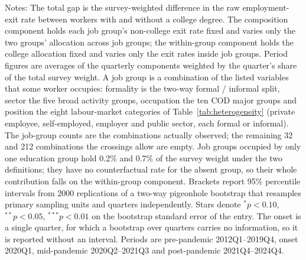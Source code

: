 \begin{table}[H]
\begin{threeparttable}
\begin{tablenotes}[flushleft]
\item Notes: The total gap is the survey-weighted difference in the raw employment-exit rate between workers with and without a college degree. The composition component holds each job group's non-college exit rate fixed and varies only the two groups' allocation across job groups; the within-group component holds the college allocation fixed and varies only the exit rates inside job groups. Period figures are averages of the quarterly components weighted by the quarter's share of the total survey weight. A job group is a combination of the listed variables that some worker occupies: formality is the two-way formal / informal split, sector the five broad activity groups, occupation the ten COD major groups and position the eight labour-market categories of Table~\ref{tab:heterogeneity} (private employee, self-employed, employer and public sector, each formal or informal). The job-group counts are the combinations actually observed; the remaining 32 and 212 combinations the crossings allow are empty. Job groups occupied by only one education group hold 0.2\% and 0.7\% of the survey weight under the two definitions; they have no counterfactual rate for the absent group, so their whole contribution falls on the within-group component. Brackets report 95\% percentile intervals from 2000 replications of a two-way pigeonhole bootstrap that resamples primary sampling units and quarters independently. Stars denote $^{*}p<0.10$, $^{**}p<0.05$, $^{***}p<0.01$ on the bootstrap standard error of the entry. The onset is a single quarter, for which a bootstrap over quarters carries no information, so it is reported without an interval. Periods are pre-pandemic 2012Q1--2019Q4, onset 2020Q1, mid-pandemic 2020Q2--2021Q3 and post-pandemic 2021Q4--2024Q4.
\end{tablenotes}
\end{threeparttable}
\end{table}
